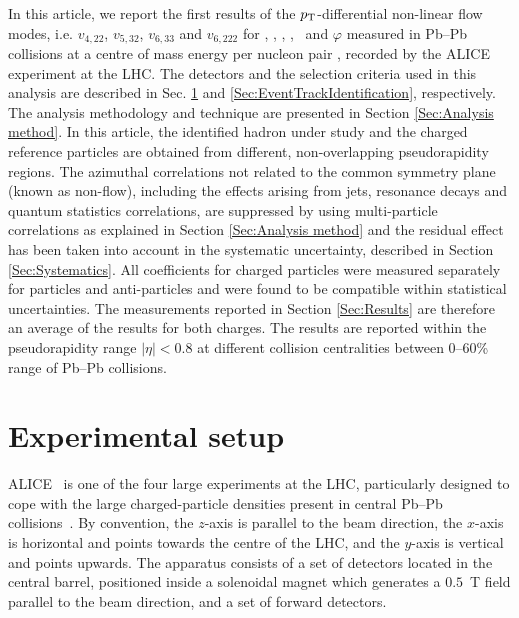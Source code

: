 \documentclass[ALICE,manyauthors]{cernphprep}
\begin{document}
In this article, we report the first results of the $p_{\rm{T}}$-differential non-linear flow modes, i.e. $v_{4,22}$, $v_{5,32}$, $v_{6,33}$ and $v_{6,222}$ for \pion, \kaon, \Ks, \proton, \lambdas~and $\varphi$ measured in Pb--Pb collisions at a centre of mass energy per nucleon pair \sNN, recorded by the ALICE experiment \cite{Aamodt:2008zz} at the LHC. The detectors and the selection criteria used in  this analysis are described in Sec. \ref{Sec:ExpSetup} and \ref{Sec:EventTrackIdentification}, respectively. %
The analysis methodology and technique are presented in Section \ref{Sec:Analysis method}. In this article, the identified hadron under study and the charged reference particles are obtained from different, non-overlapping pseudorapidity regions. The azimuthal correlations not related to the common symmetry plane (known as non-flow), including the effects arising from jets, resonance decays and quantum statistics correlations, are suppressed by using multi-particle correlations as explained in Section \ref{Sec:Analysis method} and the residual effect has been taken into account in the systematic uncertainty, described in Section \ref{Sec:Systematics}. All coefficients for charged particles were measured separately for particles and anti-particles and were found to be compatible within statistical uncertainties. The measurements reported in Section \ref{Sec:Results} are therefore an average of the results for both charges. The results are reported within the pseudorapidity range $|\eta|<0.8$ at different collision centralities between 0--60\% range of Pb--Pb collisions. 








\section{Experimental setup}
\label{Sec:ExpSetup}
ALICE~\cite{Aamodt:2008zz,Abelev:2014ffa} is one of the four large experiments at the LHC, particularly designed to cope with the large charged-particle densities present in central Pb--Pb collisions~\cite{Aamodt:2010pb}. By convention, the $z$-axis is parallel to the beam direction, the $x$-axis is horizontal and points towards the centre of the LHC, and the $y$-axis is vertical and points upwards. The apparatus consists of a set of detectors located in the central barrel, positioned inside a solenoidal magnet which generates a $0.5$~T field parallel to the beam direction, and a set of forward detectors. 
\end{document}

